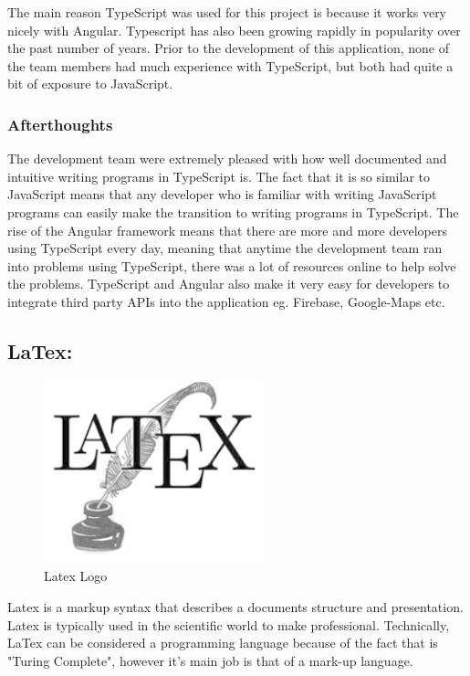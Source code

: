 \bigskip

The main reason TypeScript was used for this project is because it works very nicely with Angular. Typescript has also been growing rapidly in popularity over the past number of years. Prior to the development of this application, none of the team members had much experience with TypeScript, but both had quite a bit of exposure to JavaScript. 

\subsubsection{Afterthoughts}

The development team were extremely pleased with how well documented and intuitive writing programs in TypeScript is.  The fact that it is so similar to JavaScript means that any developer who is familiar with writing JavaScript programs can easily make the transition to writing programs in TypeScript. The rise of the Angular framework means that there are more and more developers using TypeScript every day, meaning that anytime the development team ran into problems using TypeScript, there was a lot of resources online to help solve the problems. TypeScript and Angular also make it very easy for developers to integrate third party APIs into the application eg. Firebase, Google-Maps etc.


\subsection{LaTex:}
\label{sec:TechnologyReviewLatex}

\begin{figure}[H]
    \centering
    \includegraphics[width=\textwidth, height=150pt]{img/LaTexLogo.PNG}
    \caption{Latex Logo}
    \label{fig:my_label}
\end{figure}


Latex is a markup syntax that describes a documents structure and presentation. Latex is typically used in the scientific world to make professional. Technically, LaTex can be considered a programming language because of the fact that is "Turing Complete", however it's main job is that of a mark-up language.   

